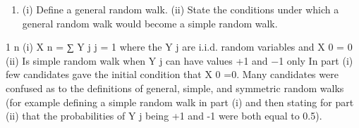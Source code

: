 \documentclass[a4paper,12pt]{article}
\begin{document}
\begin{enumerate}
\item %
(i) Define a general random walk.
(ii) State the conditions under which a general random walk would become a
simple random walk.


\end{enumerate}
\newpage

1
n
(i)
X n = ∑ Y j
j = 1
where the Y j are i.i.d. random variables and X 0 = 0
(ii)
Is simple random walk when Y j can have values +1 and −1 only
In part (i) few candidates gave the initial condition that X 0 =0. Many candidates were
confused as to the definitions of general, simple, and symmetric random walks (for example
defining a simple random walk in part (i) and then stating for part (ii) that the probabilities
of Y j being +1 and -1 were both equal to 0.5).
\end{document}
